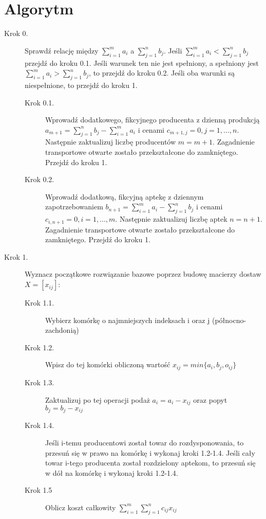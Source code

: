 \documentclass[11pt]{article}
\begin{document}
\section{Algorytm}
\begin{description}
    \item[Krok 0.] Sprawdź relację między $\sum\limits_{i=1}^{m} a_{i}$ a $\sum\limits_{j=1}^n b_{j}$. Jeśli $\sum\limits_{i=1}^{m} a_{i} < \sum\limits_{j=1}^n b_{j}$ przejdź do kroku 0.1. Jeśli warunek ten nie jest spełniony, a spełniony jest $\sum\limits_{i=1}^{m} a_{i} > \sum\limits_{j=1}^n b_{j}$, to przejdź do kroku 0.2. Jeśli oba warunki są niespełnione, to przejdź do kroku 1.
    \begin{description}
        \item[Krok 0.1.] Wprowadź dodatkowego, fikcyjnego producenta z dzienną produkcją $a_{m+1}=\sum\limits_{j=1}^{n} b_{j}-\sum\limits_{i=1}^{m} a_{i}$ i cenami $c_{m+1,j} = 0, j=1,...,n$. Następnie zaktualizuj liczbę producentów $m=m+1$. Zagadnienie transportowe otwarte zostało przekształcone do zamkniętego. Przejdź do kroku 1.
        \item[Krok 0.2.] Wprowadź dodatkową, fikcyjną aptekę z dziennym zapotrzebowaniem $b_{n+1}=\sum\limits_{i=1}^{m} a_{i}-\sum\limits_{j=1}^n b_{j}$ i cenami $c_{i,n+1} = 0, i=1,...,m$. Następnie zaktualizuj liczbę aptek $n=n+1$. Zagadnienie transportowe otwarte zostało przekształcone do zamkniętego. Przejdź do kroku 1.
    \end{description}
    \item[Krok 1.] Wyznacz początkowe rozwiązanie bazowe poprzez budowę macierzy dostaw $X=[x_{ij}]$:
    \begin{description}
        \item[Krok 1.1.] Wybierz komórkę o najmniejszych indeksach i oraz j (północno-zachdonią)
        \item[Krok 1.2.] Wpisz do tej komórki obliczoną wartość $x_{ij}=min\{a_{i},b_{j},o_{ij}\}$
        \item[Krok 1.3.] Zaktualizuj po tej operacji podaż $a_{i}=a_{i}-x_{ij}$ oraz popyt $b_{j}=b_{j}-x_{ij}$
        \item[Krok 1.4.] Jeśli i-temu producentowi został towar do rozdysponowania, to przesuń się w prawo na komórkę i wykonaj kroki 1.2-1.4. Jeśli cały towar i-tego producenta został rozdzielony aptekom, to przesuń się w dół na komórkę i wykonaj kroki 1.2-1.4.
        \item[Krok 1.5] Oblicz koszt całkowity $\sum\limits_{i=1}^{m}\sum\limits_{j=1}^{n}c_{ij}x_{ij}$

\end{description}
\end{description}
\end{document}
